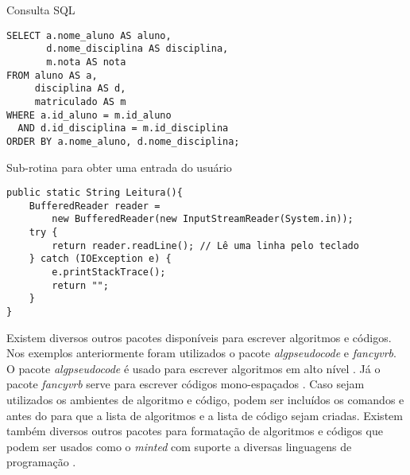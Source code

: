\begin{codigo}[!htb]
\caption{Consulta SQL} \label{codigo:notas_alunos}
\begin{Verbatim}[frame=lines]
SELECT a.nome_aluno AS aluno,
       d.nome_disciplina AS disciplina,
       m.nota AS nota
FROM aluno AS a,
     disciplina AS d,
     matriculado AS m
WHERE a.id_aluno = m.id_aluno
  AND d.id_disciplina = m.id_disciplina
ORDER BY a.nome_aluno, d.nome_disciplina;
\end{Verbatim}
\end{codigo}

\begin{codigo}[!htb]
\caption{Sub-rotina para obter uma entrada do usuário} \label{codigo:metodo_leitura}
\begin{Verbatim}[frame=lines]
public static String Leitura(){
    BufferedReader reader =
        new BufferedReader(new InputStreamReader(System.in));
    try {
        return reader.readLine(); // Lê uma linha pelo teclado
    } catch (IOException e) {
        e.printStackTrace();
        return "";
    }
}
\end{Verbatim}
\end{codigo}

Existem diversos outros pacotes disponíveis para escrever algoritmos e códigos. Nos exemplos anteriormente foram utilizados o pacote \textit{algpseudocode} e \textit{fancyvrb}. O pacote \textit{algpseudocode} é usado para escrever algoritmos em alto nível \cite{janos:2005:algpseudocode}. Já o pacote \textit{fancyvrb} serve para escrever códigos mono-espaçados \cite{zandt:2010:fancyvrb}.
Caso sejam utilizados os ambientes de algoritmo e código, podem ser incluídos os comandos  e  antes do  para que a lista de algoritmos e a lista de código sejam criadas.
Existem também diversos outros pacotes para formatação de algoritmos e códigos que podem ser usados como o \textit{minted} com suporte a diversas linguagens de programação \cite{poore:2016:minted}.
